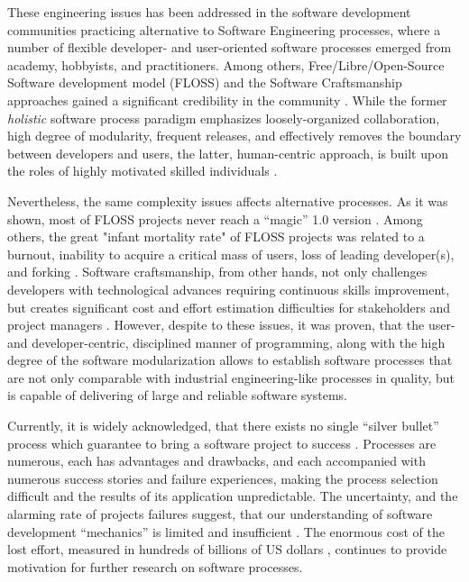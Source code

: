 These engineering issues has been addressed in the software development communities practicing 
alternative to Software Engineering processes, where a number of flexible developer- and user-oriented 
software processes emerged from academy, hobbyists, and practitioners.
Among others, Free/Libre/Open-Source Software development model (FLOSS) and the 
Software Craftsmanship  approaches gained a significant credibility in the community \cite{citeulike:3729379}. 
While the former \textit{holistic} software process paradigm emphasizes loosely-organized 
collaboration, high degree of modularity, frequent releases, and effectively removes the boundary 
between developers and users, the latter, human-centric approach, is built upon the roles of highly 
motivated skilled individuals \cite{citeulike:262020} \cite{citeulike:2759198}. 

Nevertheless, the same complexity issues affects alternative processes.
As it was shown, most of FLOSS projects never reach a ``magic'' 1.0 version \cite{citeulike:12480029}. 
Among others, the great "infant mortality rate" of FLOSS projects was related to a burnout, 
inability to acquire a critical mass of users, loss of leading developer(s), and forking \cite{richter2007critique}. 
Software craftsmanship, from other hands, not only challenges developers with technological advances 
requiring continuous skills improvement, but creates significant cost and effort estimation difficulties for
stakeholders and project managers \cite{citeulike:11058784}. However, despite to these issues, 
it was proven, that the user- and developer-centric, disciplined manner of programming, along with the high 
degree of the software modularization allows to establish software processes that are not only comparable 
with industrial engineering-like processes in quality, but is capable of delivering of large and 
reliable software systems.

Currently, it is widely acknowledged, that there exists no single ``silver bullet'' process which 
guarantee to bring a software project to success \cite{citeulike:1986013}. 
Processes are numerous, each has advantages and drawbacks, and each accompanied with 
numerous success stories and failure experiences, making the process selection difficult 
and the results of its application unpredictable.
The uncertainty, and the alarming rate of projects failures suggest, that our understanding 
of software development ``mechanics'' is limited and insufficient \cite{citeulike:12550665}. 
The enormous cost of the lost effort, measured in hundreds of billions of US dollars 
\cite{citeulike:2207657} \cite{citeulike:2207653} \cite{citeulike:2207655}, 
continues to provide motivation for further research on software processes. 

